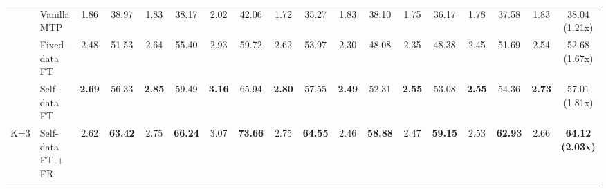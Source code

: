 \documentclass{article} %
\begin{document}
\begin{table}[ht]
\begin{adjustbox}{width=\textwidth}
\begin{tabular}{clcccccccccccccccc}
                                  & Vanilla MTP                                   & 1.86                         & 38.97                                  & 1.83                         & 38.17                                  & 2.02                         & 42.06                                  & 1.72                         & 35.27                                  & 1.83                         & 38.10                                  & 1.75                         & 36.17                                  & 1.78                         & 37.58                                  & 1.83                         & 38.04 (1.21x)                                  \\
                                  & Fixed-data FT                             & 2.48                         & 51.53                                  & 2.64                         & 55.40                                  & 2.93                         & 59.72                                  & 2.62                         & 53.97                                  & 2.30                         & 48.08                                  & 2.35                         & 48.38                                  & 2.45                         & 51.69                                  & 2.54                         & 52.68 (1.67x)                                  \\
                                  & Self-data FT                              & \textbf{2.69}                & 56.33                                  & \textbf{2.85}                & 59.49                                  & \textbf{3.16}                & 65.94                                  & \textbf{2.80}                & 57.55                                  & \textbf{2.49}                & 52.31                                  & \textbf{2.55}                & 53.08                                  & \textbf{2.55}                & 54.36                                  & \textbf{2.73}                & 57.01 (1.81x)                                  \\
\multirow{-4}{*}{K=3}             & \cellcolor[HTML]{E5F6FF}Self-data FT + FR & \cellcolor[HTML]{E5F6FF}2.62 & \cellcolor[HTML]{E5F6FF}\textbf{63.42} & \cellcolor[HTML]{E5F6FF}2.75 & \cellcolor[HTML]{E5F6FF}\textbf{66.24} & \cellcolor[HTML]{E5F6FF}3.07 & \cellcolor[HTML]{E5F6FF}\textbf{73.66} & \cellcolor[HTML]{E5F6FF}2.75 & \cellcolor[HTML]{E5F6FF}\textbf{64.55} & \cellcolor[HTML]{E5F6FF}2.46 & \cellcolor[HTML]{E5F6FF}\textbf{58.88} & \cellcolor[HTML]{E5F6FF}2.47 & \cellcolor[HTML]{E5F6FF}\textbf{59.15} & \cellcolor[HTML]{E5F6FF}2.53 & \cellcolor[HTML]{E5F6FF}\textbf{62.93} & \cellcolor[HTML]{E5F6FF}2.66 & \cellcolor[HTML]{E5F6FF}\textbf{64.12 (2.03x)} \\ \bottomrule
\end{tabular}
\end{adjustbox}
\end{table}
\end{document}
